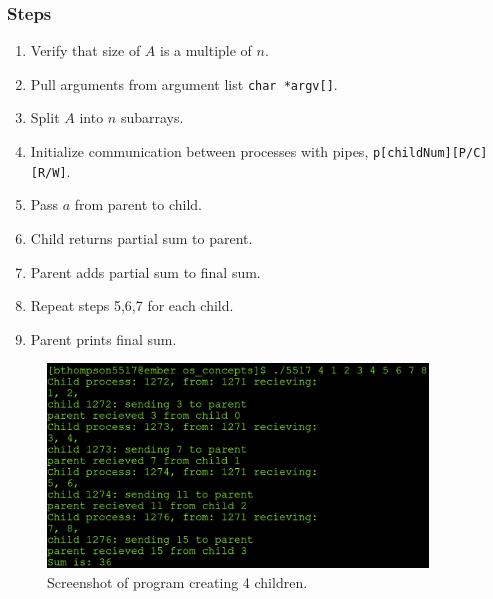 \documentclass[12pt]{article}
\begin{document}
	\subsubsection*{Steps}
        \begin{enumerate}
		\item Verify that size of $A$ is a multiple of  $n$. 
		\item Pull arguments from argument list \verb|char *argv[]|.
		\item Split $A$ into $n$ subarrays.
		\item Initialize communication between processes with pipes,
			\verb|p[childNum][P/C][R/W]|.
		\item Pass $a$ from parent to child.
		\item Child returns partial sum to parent.
		\item Parent adds partial sum to final sum.
		\item Repeat steps 5,6,7 for each child.
		\item Parent prints final sum.
        \end{enumerate}
	\begin{figure}[ht!]
		\centering
		\includegraphics[width=0.9\textwidth]{assignment1.jpg}
		\caption{Screenshot of program creating 4 children.}
		\label{fig:assignment1}
	\end{figure}
\end{document}
